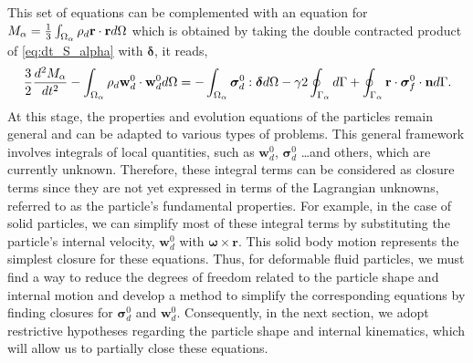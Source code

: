 This set of equations can be complemented with an equation for $M_\alpha = \frac{1}{3}\int_{\Omega_{\alpha}} \rho_d \textbf{r}\cdot \textbf{r} d\Omega$ which is obtained by taking the double contracted product of \ref{eq:dt_S_alpha} with $\bm\delta$,
it reads, 
\begin{equation}
    \frac{3}{2}\frac{d^2 M_\alpha}{dt^2}
    - \intO{ \rho_d \textbf{w}_d^0 \cdot \textbf{w}_d^0}
    = 
    - \intO{\bm\sigma_d^0:\bm\delta} 
    - \gamma 2 \intS{}
    + \intS{\textbf{r}\cdot\bm\sigma_f^0\cdot \textbf{n}}.
    \label{eq:dt_D_alpha}
\end{equation}
At this stage, the properties and evolution equations of the particles remain general and can be adapted to various types of problems. 
This general framework involves integrals of local quantities, such as $\textbf{w}_d^0$, $\bm\sigma_d^0$ \ldots and others, which are currently unknown. 
Therefore, these integral terms can be considered as closure terms since they are not yet expressed in terms of the Lagrangian unknowns, referred to as the particle's fundamental properties.
For example, in the case of solid particles, we can simplify most of these integral terms by substituting the particle's internal velocity, $\textbf{w}_d^0$ with $ \bm\omega \times \textbf{r}$. 
This solid body motion represents the simplest closure for these equations.  
Thus, for deformable fluid particles, we must find a way to reduce the degrees of freedom related to the particle shape and internal motion and develop a method to simplify the corresponding equations by finding closures for $\bm\sigma_d^0$ and $\textbf{w}_d^0$.
Consequently, in the next section, we adopt restrictive hypotheses regarding the particle shape and internal kinematics, which will allow us to partially close these equations.